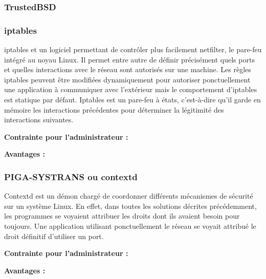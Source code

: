 \subsubsection{TrustedBSD}


\subsubsection{iptables}

iptables et un logiciel permettant de contrôler plus facilement netfilter, le pare-feu intégré au noyau Linux. Il permet entre autre de définir précisément quels ports et quelles interactions avec le réseau sont autorisés sur une machine. Les règles iptables peuvent être modifiées dynamiquement pour autoriser ponctuellement une application à communiquer avec l'extérieur mais le comportement d'iptables est statique par défaut. Iptables est un pare-feu à états, c'est-à-dire qu'il garde en mémoire les interactions précédentes pour déterminer la légitimité des interactions suivantes.

\begin{list}{}{}
 \item \textbf{Contrainte pour l'administrateur :}
 \item \textbf{Avantages :}
\end{list}

\subsubsection{PIGA-SYSTRANS ou contextd}

Contextd est un démon chargé de coordonner différents mécanismes de sécurité sur un système Linux. En effet, dans toutes les solutions décrites précédemment, les programmes se voyaient attribuer les droits dont ils avaient besoin pour toujours. Une application utilisant ponctuellement le réseau se voyait attribué le droit définitif d'utiliser un port.

\begin{list}{}{}
 \item \textbf{Contrainte pour l'administrateur :}
 \item \textbf{Avantages :}
\end{list}

% 
% 
% 
